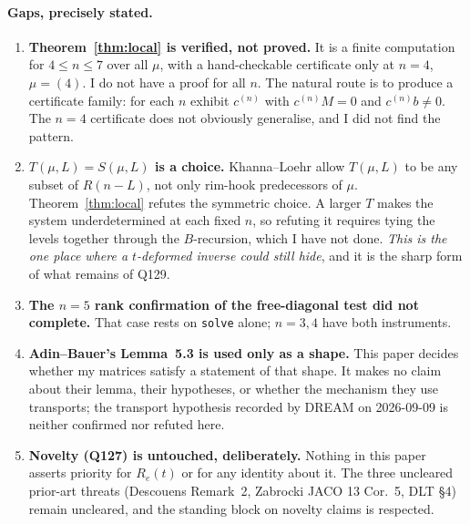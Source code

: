 \documentclass[11pt]{article}
\theoremstyle{definition}
\theoremstyle{remark}
\begin{document}
\paragraph{Gaps, precisely stated.}
\begin{enumerate}
\item \textbf{Theorem~\ref{thm:local} is verified, not proved.}  It is a finite computation for
$4\le n\le7$ over all $\mu$, with a hand-checkable certificate only at $n=4$, $\mu=(4)$.  I do
not have a proof for all $n$.  The natural route is to produce a certificate family: for each
$n$ exhibit $c^{(n)}$ with $c^{(n)}M=0$ and $c^{(n)}b\ne0$.  The $n=4$ certificate does not
obviously generalise, and I did not find the pattern.
\item \textbf{$T(\mu,L)=S(\mu,L)$ is a choice.}  Khanna--Loehr allow $T(\mu,L)$ to be any
subset of $R(n-L)$, not only rim-hook predecessors of $\mu$.  Theorem~\ref{thm:local} refutes
the symmetric choice.  A larger $T$ makes the system underdetermined at each fixed $n$, so
refuting it requires tying the levels together through the $B$-recursion, which I have not
done.  \emph{This is the one place where a $t$-deformed inverse could still hide}, and it is
the sharp form of what remains of Q129.
\item \textbf{The $n=5$ rank confirmation of the free-diagonal test did not complete.}  That
case rests on \texttt{solve} alone; $n=3,4$ have both instruments.
\item \textbf{Adin--Bauer's Lemma~5.3 is used only as a shape.}  This paper decides whether my
matrices satisfy a statement of that shape.  It makes no claim about their lemma, their
hypotheses, or whether the mechanism they use transports; the transport hypothesis recorded
by DREAM on 2026-09-09 is neither confirmed nor refuted here.
\item \textbf{Novelty (Q127) is untouched, deliberately.}  Nothing in this paper asserts
priority for $R_e(t)$ or for any identity about it.  The three uncleared prior-art threats
(Descouens Remark~2, Zabrocki JACO 13 Cor.~5, DLT \S4) remain uncleared, and the standing
block on novelty claims is respected.
\end{enumerate}
\end{document}
